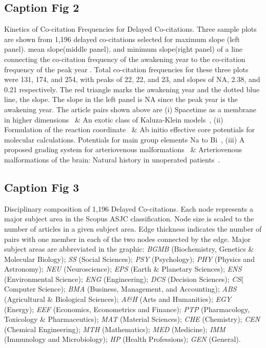 \documentclass[utf8]{frontiersSCNS}
\begin{document}
\subsection{Caption Fig 2} Kinetics of Co-citation Frequencies for Delayed Co-citations. Three sample plots are shown from 1,196 delayed co-citations selected for maximum slope (left panel). mean slope(middle panel), and minimum slope(right panel) of a line connecting the co-citation frequency of the awakening year to the co-citation frequency of the peak year . Total co-citation frequencies for these three plots were 131, 174, and 254, with peaks of 22, 22, and 23, and slopes of NA, 2.38, and 0.21 respectively. The red triangle marks the awakening year and the dotted blue line, the slope. The slope in the left panel is NA since the peak year is the awakening year. The article pairs shown above are (i) Spacetime as a membrane in higher dimensions~\citep{Gibbons1987} \& An exotic class of Kaluza-Klein models~\citep{Visser1985}, (ii) Formulation of the reaction coordinate~\citep{Fukui1970} \& Ab initio effective core potentials for molecular calculations. Potentials for main group elements Na to Bi~\citep{Wadt1985}, (iii) A proposed grading system for arteriovenous malformations~\citep{Spetzler1986} \& Arteriovenous malformations of the brain: Natural history in unoperated patients~\citep{Crawford1986}.

\subsection{Caption Fig 3} Disciplinary composition of 1,196 Delayed Co-citations. Each node represents a major subject area in the Scopus ASJC classification. Node size is scaled to the number of articles in a given subject area. Edge thickness indicates the number of pairs with one member in each of the two nodes connected by the edge. Major subject areas are abbreviated in the graphic:
\emph{BGMB} (Biochemistry, Genetics \& Molecular Biology);
\emph{SS} (Social Sciences);
\emph{PSY} (Psychology);
\emph{PHY} (Physics and Astronomy);
\emph{NEU} (Neuroscience);
\emph{EPS} (Earth \& Planetary Sciences);
\emph{ENS} (Environmental Science);
\emph{ENG} (Engineering);
\emph{DCS} (Decision Sciences);
\emph{CS}( Computer Science);
\emph{BMA} (Business, Management, and Accounting);
\emph{ABS} (Agricultural \& Biological Sciences); 
\emph{A\&H} (Arts and Humanities);
\emph{EGY} (Energy);
\emph{EEF} (Economics, Econometrics and Finance);
\emph{PTP} (Pharmacology, Toxicology \& Pharmaceutics);
\emph{MAT} (Material Sciences);
\emph{CHE} (Chemistry);
\emph{CEN} (Chemical Engineering);
\emph{MTH} (Mathematics);
\emph{MED} (Medicine);
\emph{IMM} (Immunology and Microbiology);
\emph{HP} (Health Professions);
\emph{GEN} (General).
\end{document}
